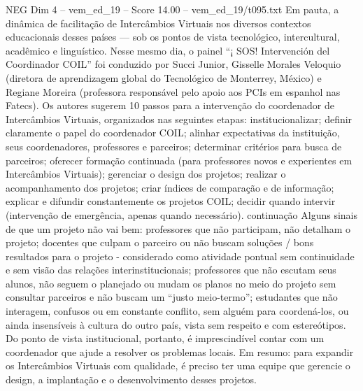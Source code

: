 \begin{textsample}{NEG Dim 4 – vem\_ed\_19 – Score 14.00 – vem\_ed\_19/t095.txt}
Em pauta, a dinâmica de facilitação de Intercâmbios Virtuais nos diversos contextos educacionais desses países — sob os pontos de vista tecnológico, intercultural, acadêmico e linguístico.
Nesse mesmo dia, o painel “¡ SOS!
Intervención del Coordinador COIL” foi conduzido por Succi Junior, Gisselle Morales Veloquio (diretora de aprendizagem global do Tecnológico de Monterrey, México) e Regiane Moreira (professora responsável pelo apoio aos PCIs em espanhol nas Fatecs).
Os autores sugerem 10 passos para a intervenção do coordenador de Intercâmbios Virtuais, organizados nas seguintes etapas: institucionalizar; definir claramente o papel do coordenador COIL; alinhar expectativas da instituição, seus coordenadores, professores e parceiros; determinar critérios para busca de parceiros; oferecer formação continuada (para professores novos e experientes em Intercâmbios Virtuais); gerenciar o design dos projetos; realizar o acompanhamento dos projetos; criar índices de comparação e de informação; explicar e difundir constantemente os projetos COIL; decidir quando intervir (intervenção de emergência, apenas quando necessário). continuação Alguns sinais de que um projeto não vai bem: professores que não participam, não detalham o projeto; docentes que culpam o parceiro ou não buscam soluções / bons resultados para o projeto - considerado como atividade pontual sem continuidade e sem visão das relações interinstitucionais; professores que não escutam seus alunos, não seguem o planejado ou mudam os planos no meio do projeto sem consultar parceiros e não buscam um “justo meio-termo”; estudantes que não interagem, confusos ou em constante conflito, sem alguém para coordená-los, ou ainda insensíveis à cultura do outro país, vista sem respeito e com estereótipos.
Do ponto de vista institucional, portanto, é imprescindível contar com um coordenador que ajude a resolver os problemas locais.
Em resumo: para expandir os Intercâmbios Virtuais com qualidade, é preciso ter uma equipe que gerencie o design, a implantação e o desenvolvimento desses projetos.

\end{textsample}
